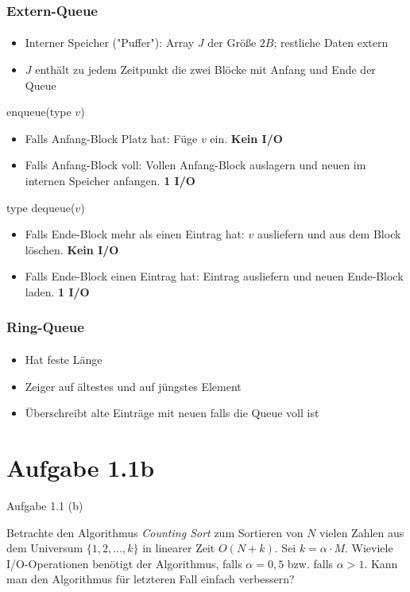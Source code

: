 \documentclass{beamer}
\begin{document}
\begin{frame}
  \frametitle{Extern-Queue}
  \framesubtitle{}
  \begin{itemize}[<+->]
    \item Interner Speicher ("Puffer"): Array $J$ der Größe $2B$; restliche Daten extern
    \item $J$ enthält zu jedem Zeitpunkt die zwei Blöcke mit Anfang und Ende der Queue
  \end{itemize}

  enqueue(type $v$)
  \begin{itemize}[<+->]
    \item Falls Anfang-Block Platz hat: Füge $v$ ein. \bf{Kein I/O}
    \item Falls Anfang-Block voll: Vollen Anfang-Block auslagern und neuen im internen Speicher anfangen. \bf{1 I/O}
  \end{itemize}

  type dequeue($v$)
  \begin{itemize}[<+->]
    \item Falls Ende-Block mehr als einen Eintrag hat: $v$ ausliefern und aus dem Block löschen. \bf{Kein I/O}
    \item Falls Ende-Block einen Eintrag hat: Eintrag ausliefern und neuen Ende-Block laden. \bf{1 I/O}
  \end{itemize}
\end{frame}

\begin{frame}
  \frametitle{Ring-Queue}
  \framesubtitle{}
  \begin{itemize}
    \item Hat feste Länge
    \item Zeiger auf ältestes und auf jüngstes Element
    \item Überschreibt alte Einträge mit neuen falls die Queue voll ist
  \end{itemize}
\end{frame}

\section{Aufgabe 1.1b}
\begin{frame}{Aufgabe 1.1 (b)}

  Betrachte den Algorithmus \emph{Counting Sort} zum Sortieren von $N$ vielen Zahlen aus dem Universum $\{1,2,\dots{},k\}$ in linearer Zeit $O(N+k)$. 
  Sei $k = \alpha \cdot M$.
  Wieviele I/O-Operationen benötigt der Algorithmus, falls $\alpha = 0,5$ bzw. falls $\alpha > 1$.
  Kann man den Algorithmus für letzteren Fall einfach verbessern?
\end{frame}
\end{document}
